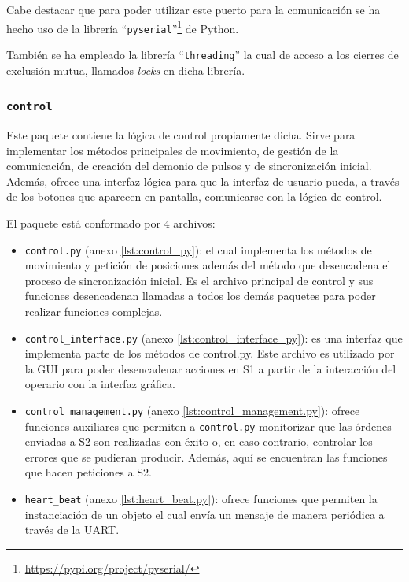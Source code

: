 Cabe destacar que para poder utilizar este puerto para la comunicación se ha hecho uso de la librería ``\texttt{pyserial}''\footnote{\url{https://pypi.org/project/pyserial/}} de Python.

También se ha empleado la librería ``\texttt{threading}'' la cual de acceso a los cierres de exclusión mutua, llamados \textit{locks} en dicha librería.

\subsubsection{\texttt{control}}

Este paquete contiene la lógica de control propiamente dicha. Sirve para implementar los métodos principales de movimiento, de gestión de la comunicación, de creación del demonio de pulsos y de  sincronización inicial. Además, ofrece una interfaz lógica para que la interfaz de usuario pueda, a través de los botones que aparecen en pantalla, comunicarse con la lógica de control.

El paquete está conformado por 4 archivos:

\begin{itemize}
    \item \texttt{control.py} (anexo \ref{lst:control_py}): el cual implementa los métodos de movimiento y petición de posiciones además del método que desencadena el proceso de sincronización inicial. Es el archivo principal de control y sus funciones desencadenan llamadas a todos los demás paquetes para poder realizar funciones complejas.
    \item \texttt{control\_interface.py} (anexo \ref{lst:control_interface_py}): es una interfaz que implementa parte de los métodos de control.py. Este archivo es utilizado por la GUI para poder desencadenar acciones en \ac{S1} a partir de la interacción del operario con la interfaz gráfica.
    \item \texttt{control\_management.py} (anexo \ref{lst:control_management.py}): ofrece funciones auxiliares que permiten a \texttt{control.py} monitorizar que las órdenes enviadas a \ac{S2} son realizadas con éxito o, en caso contrario, controlar los errores que se pudieran producir.
    Además, aquí se encuentran las funciones que hacen peticiones a \ac{S2}.
    \item \texttt{heart\_beat} (anexo \ref{lst:heart_beat.py}): ofrece funciones que permiten la instanciación de un objeto el cual envía un mensaje de manera periódica a través de la UART.
\end{itemize}

